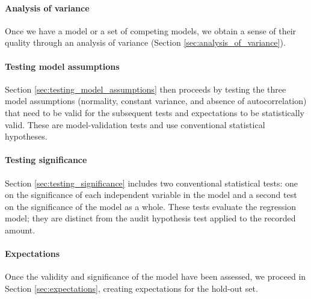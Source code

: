 
\paragraph{Analysis of variance} %
\label{par:analysis_of_variance}

Once we have a model or a set of competing models, we obtain a sense of their quality through an analysis of variance (Section \ref{sec:analysis_of_variance}).


\paragraph{Testing model assumptions} %
\label{par:testing_model_assumptions}

Section \ref{sec:testing_model_assumptions} then proceeds by testing the three model assumptions (normality, constant variance, and absence of autocorrelation) that need to be valid for the subsequent tests and expectations to be statistically valid. These are model-validation tests and use conventional statistical hypotheses.


\paragraph{Testing significance} %
\label{par:testing_significance}

Section \ref{sec:testing_significance} includes two conventional statistical tests: one on the significance of each independent variable in the model and a second test on the significance of the model as a whole. These tests evaluate the regression model; they are distinct from the audit hypothesis test applied to the recorded amount.


\paragraph{Expectations} %
\label{par:expectations}

Once the validity and significance of the model have been assessed, we proceed in Section \ref{sec:expectations}, creating expectations for the hold-out set. 


